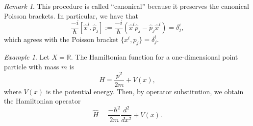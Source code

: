 \documentclass[12pt]{article}
\theoremstyle{definition}
\theoremstyle{remark}
\newtheorem*{rmk}{Remark}
\newtheorem{ex}{Example}
\newcommand{\reals}{\mathbb{R}}
\begin{document}
\begin{rmk}
This procedure is called ``canonical'' because it preserves the canonical Poisson brackets.  In particular, we have that 
\begin{equation*}\frac{-i}{\hbar}[\hat{x}^i, \hat{p}_j] := \frac{-i}{\hbar}\left(\hat{x}^i\hat{p}_j - \hat{p}_j\hat{x}^i\right) = \delta^i_j,
\end{equation*}
which agrees with the Poisson bracket $\{ x^i, p_j \} = \delta^i_j$.
\end{rmk}

\begin{ex}
Let $X = \reals$.  The Hamiltonian function for a one-dimensional point particle with mass $m$ is
\begin{equation*}
H = \frac{p^2}{2m} + V(x),
\end{equation*}
where $V(x)$ is the potential energy.  Then, by operator substitution, we obtain the Hamiltonian operator
\begin{equation*}
\hat{H} = \frac{-\hbar^2}{2m} \frac{d^2}{dx^2} + V(x).
\end{equation*}
\end{ex}
\end{document}
